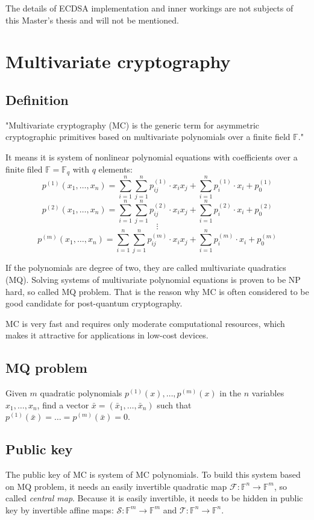 \documentclass[thesis=M,english]{FITthesis}[2019/12/23]
\begin{document}
\bigskip
\noindent
The details of ECDSA implementation and inner workings are not subjects of this Master's thesis and will not be mentioned.

\newpage
\section{Multivariate cryptography}
\subsection{Definition}
"Multivariate cryptography (MC) is the generic term for asymmetric cryptographic primitives based on multivariate polynomials over a finite field $\mathbb{F}$."\cite{L-WIKI1}

It means it is system of nonlinear polynomial equations with coefficients over a finite filed $\mathbb{F} = \mathbb{F}_q$ with $q$ elements:
\[
	p^{(1)}(x_1,\ldots,x_n) = \sum\limits_{i=1}^{n} {\sum\limits_{j=1}^{n} {p_{ij}^{(1)} \cdot x_ix_j}} + \sum\limits_{i=1}^{n} {p_{i}^{(1)} \cdot x_i} + p_0^{(1)}
\]
\[
	p^{(2)}(x_1,\ldots,x_n) = \sum\limits_{i=1}^{n} {\sum\limits_{j=1}^{n} {p_{ij}^{(2)} \cdot x_ix_j}} + \sum\limits_{i=1}^{n} {p_{i}^{(2)} \cdot x_i} + p_0^{(2)}
\]
\[
	\vdots
\]
\[
	p^{(m)}(x_1,\ldots,x_n) = \sum\limits_{i=1}^{n} {\sum\limits_{j=1}^{n} {p_{ij}^{(m)} \cdot x_ix_j}} + \sum\limits_{i=1}^{n} {p_{i}^{(m)} \cdot x_i} + p_0^{(m)}
\]
 
If the polynomials are degree of two, they are called multivariate quadratics (MQ). Solving systems of multivariate polynomial equations is proven to be NP hard, so called MQ problem. That is the reason why MC is often considered to be good candidate for post-quantum cryptography.

MC is very fast and requires only moderate computational resources, which makes it attractive for applications in low-cost devices.

\subsection{MQ problem}
Given $m$ quadratic polynomials $p^{(1)}(x),\ldots,p^{(m)}(x)$ in the $n$ variables $x_1,\ldots,x_n$, find a vector $\bar{x} = (\bar{x}_1,\ldots,\bar{x}_n)$ such that $p^{(1)}(\bar{x}) = \ldots = p^{(m)}(\bar{x}) = 0$.

\subsection{Public key}
The public key of MC is system of MC polynomials. To build this system based on MQ problem, it needs an easily invertible quadratic map $\mathcal{F}: \mathbb{F}^n \rightarrow \mathbb{F}^m$, so called \textit{central map}. Because it is easily invertible, it needs to be hidden in public key by invertible affine maps: $\mathcal{S}: \mathbb{F}^m \rightarrow \mathbb{F}^m$ and $\mathcal{T}: \mathbb{F}^n \rightarrow \mathbb{F}^n$.
\end{document}

